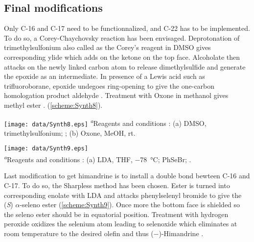 \subsection*{Final modifications}
Only C-16 and C-17 need to be functionnalized, and C-22 has to be implemented. To do so, a Corey-Chaychovsky reaction\autocite{Corey65} has been envisaged. Deprotonation of trimethylsulfonium also called as the Corey's reagent in DMSO gives corresponding ylide which adds on the ketone on the top face. Alcoholate then attacks on the newly linked carbon atom to release dimethylsulfide and generate the epoxide  as an intermediate. In presence of a Lewis acid such as trifluoroborane, epoxide undegoes ring-opening to give the one-carbon homologation product aldehyde . Treatment with Oxone\textregistered{} in methanol gives methyl ester \autocite{Borhan03}.
 (\ref{scheme:Synth8}).
\begin{figure''}
\centering
		\texttt{[image: data/Synth8.eps]}	
    \label{scheme:Synth8}
\vspace{-4pt}
\justify
\textsf{\scriptsize{\textsuperscript{\textit{a}}Reagents and conditions : (a) DMSO, trimethylsulfonium; ; (b) Oxone, MeOH, rt.}}
\end{figure''}
\vspace{-20pt}
\begin{figure''}
\centering
		\texttt{[image: data/Synth9.eps]}
    \label{scheme:Synth9}
\\
\justify   \textsf{\scriptsize{\textsuperscript{\textit{a}}Reagents and conditions : (a) LDA, THF, \SI{-78}{\celsius}; PhSeBr; .}}
\end{figure''}
Last modification to get himandrine is to install a double bond bewteen C-16 and C-17. To do so, the Sharpless method has been chosen\autocite{Sharpless73}. Ester  is turned into corresponding enolate with LDA and attacks phenylselenyl bromide to give the (\textit{S}) $\alpha$-seleno ester  (\ref{scheme:Synth9}). Once more the bottom face is shielded so the seleno ester should be in equatorial position. Treatment with hydrogen peroxide oxidizes the selenium atom leading to selenoxide  which eliminates at room temperature to the desired olefin and thus ($-$)-Himandrine .